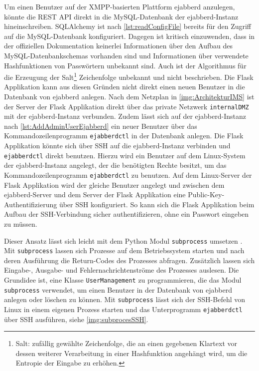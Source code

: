\documentclass[a4paper,titlepage,halfparskip,12pt]{scrreprt}
\begin{document}
\begin{onehalfspacing}
Um einen Benutzer auf der \acs{XMPP}-basierten Plattform ejabberd anzulegen, könnte die \acs{REST} \acs{API} direkt in die MySQL-Datenbank der ejabberd-Instanz hineinschreiben. SQLAlchemy ist nach \autoref{lst:readConfigFile} bereits für den Zugriff auf die MySQL-Datenbank konfiguriert. Dagegen ist kritisch einzuwenden, dass in der offiziellen Dokumentation \cite{ejabberdDoc} keinerlei Informationen über den Aufbau des MySQL-Datenbankschemas vorhanden sind und Informationen über verwendete Hashfunktionen von Passwörtern unbekannt sind. Auch ist der Algorithmus für die Erzeugung der Salt\footnote{Salt: zufällig gewählte Zeichenfolge, die an einen gegebenen Klartext vor dessen weiterer Verarbeitung in einer Hashfunktion angehängt wird, um die Entropie der Eingabe zu erhöhen.\cite{wendzel2018}} Zeichenfolge unbekannt und nicht beschrieben. Die Flask Applikation kann aus diesen Gründen nicht direkt einen neuen Benutzer in die Datenbank von ejabberd anlegen. Nach dem Netzplan in \autoref{img:ArchitekturIMS} ist der Server der Flask Applikation direkt über das private Netzwerk \texttt{internalDMZ} mit der ejabberd-Instanz verbunden. Zudem lässt sich auf der ejabberd-Instanz nach \autoref{lst:AddAdminUserEjabberd} ein neuer Benutzer über das Kommandozeilenprogramm \texttt{ejabberdctl} in der Datenbank anlegen. Die Flask Applikation könnte sich über \ac{SSH} auf die ejabberd-Instanz verbinden und \texttt{ejabberdctl} direkt benutzen. Hierzu wird ein Benutzer auf dem Linux-System der ejabberd-Instanz angelegt, der die benötigten Rechte besitzt, um das Kommandozeilenprogramm \texttt{ejabberdctl} zu benutzen. Auf dem Linux-Server der Flask Applikation wird der gleiche Benutzer angelegt und zwischen dem ejabberd-Server und dem Server der Flask Applikation eine Public-Key-Authentifizierung über \ac{SSH} konfiguriert. So kann sich die Flask Applikation beim Aufbau der \ac{SSH}-Verbindung sicher authentifizieren, ohne ein Passwort eingeben zu müssen.

Dieser Ansatz lässt sich leicht mit dem Python Modul \texttt{subprocess} umsetzen \cite{pythonSubprocess}. Mit \texttt{subprocess} lassen sich Prozesse auf dem Betriebssystem starten und nach deren Ausführung die Return-Codes des Prozesses abfragen. Zusätzlich lassen sich Eingabe-, Ausgabe- und Fehlernachrichtenströme des Prozesses auslesen. Die Grundidee ist, eine Klasse \texttt{UserManagement} zu programmieren, die das Modul \texttt{subprocess} verwendet, um einen Benutzer in der Datenbank von ejabberd anlegen oder löschen zu können. Mit \texttt{subprocess} lässt sich der \ac{SSH}-Befehl von Linux in einem eigenen Prozess starten und das Unterprogramm \texttt{ejabberdctl} über \ac{SSH} ausführen, siehe \autoref{img:subprocesSSH}.


\end{onehalfspacing}
\end{document}
